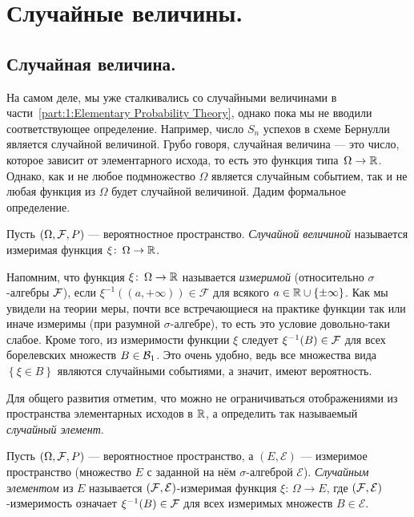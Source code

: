 \documentclass[../main.tex]{subfiles}
\begin{document}
\newpage
\section{Случайные величины.}

\subsection{Случайная величина.}

На самом деле, мы уже сталкивались со случайными величинами в части~\ref{part:1:Elementary Probability Theory}, однако пока мы не вводили соответствующее определение. Например, число $ S_n $ успехов в схеме Бернулли является случайной величиной. Грубо говоря, случайная величина --- это число, которое зависит от элементарного исхода, то есть это функция типа~$ \Omega \to \mathbb{R} $. Однако, как и не любое подмножество $ \Omega $ является случайным событием, так и не любая функция из $ \Omega $ будет случайной величиной. Дадим формальное определение.

\begin{df}
 Пусть $(\Omega, \mathcal F, P)$ --- вероятностное пространство. \textit{Случайной величиной} называется измеримая функция $\xi \colon\, \Omega \to \mathbb{R}$.
\end{df}

Напомним, что функция $ \xi \colon\, \Omega \to \mathbb{R} $ называется \textit{измеримой} (относительно $ \sigma $-алгебры $ \mathcal F $), если $ \xi^{-1}((a, +\infty)) \in \mathcal F $ для всякого $ a \in \mathbb{R} \cup \{\pm \infty\} $. Как мы увидели на теории меры, почти все  встречающиеся на практике функции так или иначе измеримы (при разумной $ \sigma $-алгебре), то есть это условие довольно-таки слабое. Кроме того, из измеримости функции $ \xi $ следует $ \xi^{-1}(B) \in \mathcal F $ для всех борелевских множеств $ B \in \mathcal B_1 $. Это очень удобно, ведь все множества вида $ \left\{ \xi \in B \right\} $ являются случайными событиями, а значит, имеют вероятность.

Для общего развития отметим, что можно не ограничиваться отображениями из пространства элементарных исходов в $ \mathbb{R} $, а определить так называемый \textit{случайный элемент}.

\begin{df*}
 Пусть $ (\Omega,\mathcal F,P) $ --- вероятностное пространство, а $ (E, \mathcal E) $ --- измеримое пространство (множество $ E $ с заданной на нём $ \sigma $-алгеброй $ \mathcal E $). \textit{Случайным элементом} из $ E $ называется $ (\mathcal F,\mathcal E) $-измеримая функция $ \xi \colon\,\Omega\to E $, где $ (\mathcal F,\mathcal E) $-измеримость означает $\xi^{-1}(B) \in \mathcal F$ для всех измеримых множеств $ B \in \mathcal E $.
\end{df*}
\end{document}

